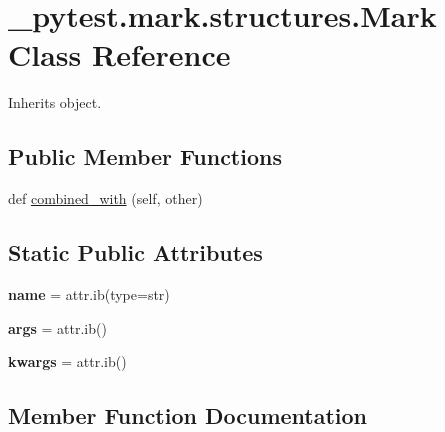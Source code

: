 \hypertarget{class__pytest_1_1mark_1_1structures_1_1_mark}{}\section{\+\_\+pytest.\+mark.\+structures.\+Mark Class Reference}
\label{class__pytest_1_1mark_1_1structures_1_1_mark}


Inherits object.

\subsection*{Public Member Functions}
\begin{DoxyCompactItemize}
\item 
def \hyperlink{class__pytest_1_1mark_1_1structures_1_1_mark_a114fea868c3c6a75f5415135028cf6e4}{combined\+\_\+with} (self, other)
\end{DoxyCompactItemize}
\subsection*{Static Public Attributes}
\begin{DoxyCompactItemize}
\item 
\mbox{\label{class__pytest_1_1mark_1_1structures_1_1_mark_a761332cf7e69b0e2770b7aa2b1331c43}} 
{\bfseries name} = attr.\+ib(type=str)
\item 
\mbox{\label{class__pytest_1_1mark_1_1structures_1_1_mark_a03c1d778cf51df8718e3cd184943f87f}} 
{\bfseries args} = attr.\+ib()
\item 
\mbox{\label{class__pytest_1_1mark_1_1structures_1_1_mark_a9f9252a7f73528de692b330ca602f211}} 
{\bfseries kwargs} = attr.\+ib()
\end{DoxyCompactItemize}


\subsection{Member Function Documentation}
\mbox{\label{class__pytest_1_1mark_1_1structures_1_1_mark_a114fea868c3c6a75f5415135028cf6e4}} 
